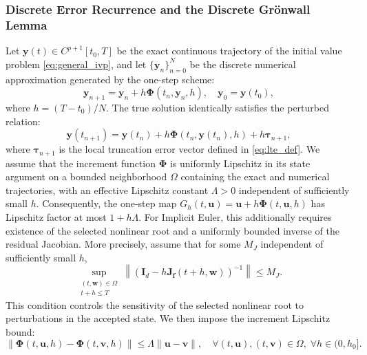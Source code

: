\documentclass[11pt,a4paper]{article}
\theoremstyle{definition}
\theoremstyle{remark}
\begin{document}
\subsubsection{Discrete Error Recurrence and the Discrete Gr\"onwall Lemma}
Let $\mathbf{y}(t) \in C^{p+1}[t_0, T]$ be the exact continuous trajectory of the initial value problem \eqref{eq:general_ivp}, and let $\{\mathbf{y}_n\}_{n=0}^N$ be the discrete numerical approximation generated by the one-step scheme:
\begin{equation}
\label{eq:increment_form_convergence}
\mathbf{y}_{n+1} = \mathbf{y}_n + h \mathbf{\Phi}(t_n, \mathbf{y}_n, h), \quad \mathbf{y}_0 = \mathbf{y}(t_0),
\end{equation}
where $h = (T - t_0)/N$. The true solution identically satisfies the perturbed relation:
\begin{equation}
\label{eq:exact_perturbed_relation}
\mathbf{y}(t_{n+1}) = \mathbf{y}(t_n) + h \mathbf{\Phi}(t_n, \mathbf{y}(t_n), h) + h \boldsymbol{\tau}_{n+1},
\end{equation}
where $\boldsymbol{\tau}_{n+1}$ is the local truncation error vector defined in \eqref{eq:lte_def}. We assume that the increment function $\mathbf{\Phi}$ is uniformly Lipschitz in its state argument on a bounded neighborhood $\Omega$ containing the exact and numerical trajectories, with an effective Lipschitz constant $\Lambda>0$ independent of sufficiently small $h$. Consequently, the one-step map $G_h(t,\mathbf{u})=\mathbf{u}+h\mathbf{\Phi}(t,\mathbf{u},h)$ has Lipschitz factor at most $1+h\Lambda$. For Implicit Euler, this additionally requires existence of the selected nonlinear root and a uniformly bounded inverse of the residual Jacobian. More precisely, assume that for some $M_J$ independent of sufficiently small $h$,
\begin{equation}
\label{eq:uniform_residual_inverse}
\sup_{\substack{(t,\mathbf{w})\in\Omega\\ t+h\le T}}
\left\|
\left(\mathbf{I}_d-h\mathbf{J}_{\mathbf f}(t+h,\mathbf{w})\right)^{-1}
\right\|\le M_J.
\end{equation}
This condition controls the sensitivity of the selected nonlinear root to perturbations in the accepted state. We then impose the increment Lipschitz bound:
\begin{equation}
\label{eq:increment_lipschitz}
\|\mathbf{\Phi}(t, \mathbf{u}, h) - \mathbf{\Phi}(t, \mathbf{v}, h)\| \le \Lambda \|\mathbf{u} - \mathbf{v}\|, \quad \forall (t, \mathbf{u}), (t, \mathbf{v}) \in \Omega, \; \forall h \in (0, h_0].
\end{equation}
\end{document}
